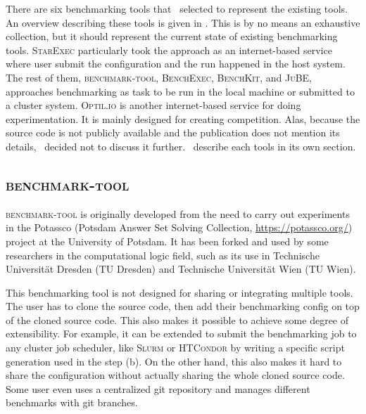 There are six benchmarking tools that \first~selected to represent the existing tools.
An overview describing these tools is given in .
This is by no means an exhaustive collection, but it should represent the current state of existing benchmarking tools.
\textsc{StarExec} particularly took the approach as an internet-based service where user submit the configuration and the run happened in the host system.
The rest of them, \textsc{benchmark-tool}, \textsc{BenchExec}, \textsc{BenchKit}, and \textsc{JuBE}, approaches benchmarking as task to be run in the local machine or submitted to a cluster system.
\textsc{Optil.io} \citep{wasikOptilIoCloud2016a} is another internet-based service for doing experimentation.
It is mainly designed for creating competition.
Alas, because the source code is not publicly available and the publication does not mention its details, \first~decided not to discuss it further.
\First~describe each tools in its own section.

\subsection{\textsc{benchmark-tool}}

\textsc{benchmark-tool} \citep{GitmirrorBenchmarktoolContribute2018} is originally developed from the need to carry out experiments in the Potassco (Potsdam Answer Set Solving Collection, \url{https://potassco.org/}) project at the University of Potsdam.
It has been forked and used by some researchers in the computational logic field, such as its use in Technische Universit\"at Dresden (TU Dresden) and Technische Universit\"at Wien (TU Wien).


This benchmarking tool is not designed for sharing or integrating multiple tools.
The user has to clone the source code, then add their benchmarking config on top of the cloned source code.
This also makes it possible to achieve some degree of extensibility.
For example, it can be extended to submit the benchmarking job to any cluster job scheduler, like \textsc{Slurm} \citep{yoo2003slurm} or \textsc{HTCondor} \citep{condor-practice} by writing a specific script generation used in the step (b).
On the other hand, this also makes it hard to share the configuration without actually sharing the whole cloned source code.
Some user even uses a centralized git repository and manages different benchmarks with git branches.

